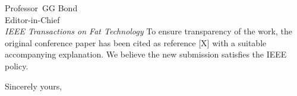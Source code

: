\documentclass[12pt]{SWJTUletter}
\begin{document}
\begin{letter}{
               Professor\ GG Bond \\
               Editor-in-Chief \\
               \textit{IEEE Transactions on Fat Technology}
               }
To ensure transparency of the work, the original conference paper has been cited as reference [X] with a suitable accompanying explanation. We believe the new submission satisfies the IEEE policy.

\lipsum[1-5]

\closing{Sincerely yours,}




\end{letter}
\end{document}
